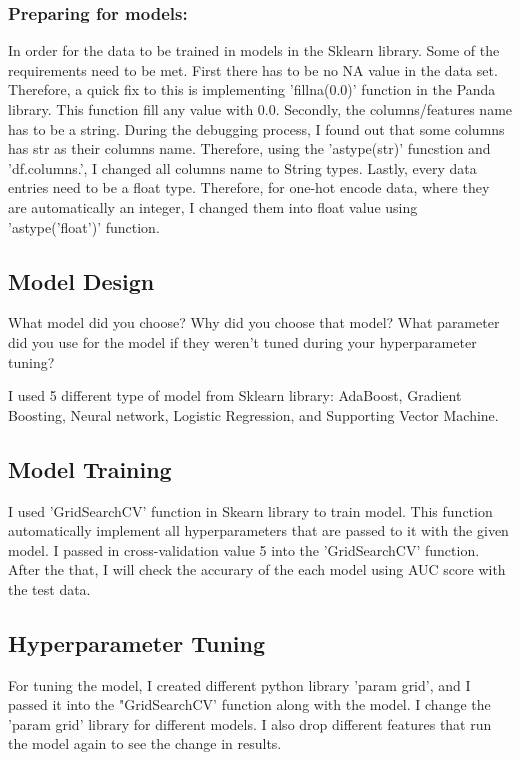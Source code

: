 \documentclass{article}
\begin{document}
\subsubsection{Preparing for models:}
In order for the data to be trained in models in the Sklearn library. Some of the requirements need to be met. First there has to be no NA value in the data set. Therefore, a quick fix to this is implementing 'fillna(0.0)' function in the Panda library. This function fill any value with 0.0. Secondly, the columns/features name has to be a string. During the debugging process, I found out that some columns has \textunderscore str as their columns name. Therefore, using the 'astype(str)' funcstion and 'df.columns.', I changed all columns name to String types. Lastly, every data entries need to be a float type. Therefore, for one-hot encode data, where they are automatically an integer, I changed them into float value using 'astype('float')' function. 
\subsection{Model Design}
What model did you choose? Why did you choose that model? What parameter did you use for the
model if they weren’t tuned during your hyperparameter tuning?

I used 5 different type of model from Sklearn library: AdaBoost, Gradient Boosting, Neural network, Logistic Regression, and Supporting Vector Machine. 
\subsection{Model Training}
I used 'GridSearchCV' function in Skearn library to train model. This function automatically implement all hyperparameters that are passed to it with the given model. I passed in cross-validation value 5 into the 'GridSearchCV' function. After the that, I will check the accurary of the each model using AUC score with the test data. 
\subsection{Hyperparameter Tuning}
For tuning the model, I created different python library 'param \textunderscore grid', and I passed it into the "GridSearchCV' function along with the model. I change the 'param \textunderscore grid' library for different models. I also drop different features that run the model again to see the change in results. 
\end{document}
